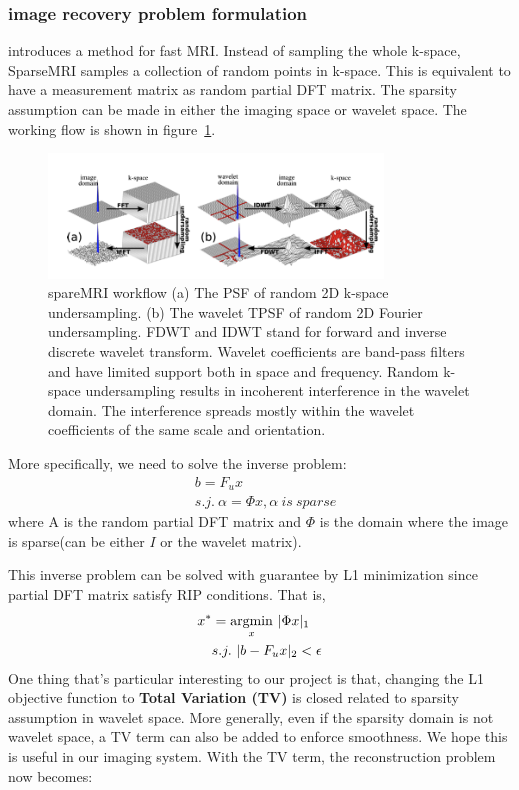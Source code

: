 \documentclass{article} %
\begin{document}
\subsubsection{image recovery problem formulation}
\cite{lustig2007sparse} introduces a method for fast MRI. Instead of sampling the whole k-space, SparseMRI samples a collection of random points in k-space. This is equivalent to have a measurement matrix as random partial DFT matrix. The sparsity assumption can be made in either the imaging space or wavelet space.  The working flow is shown in figure~\ref{fig:sparseMRIFlow}.
\begin{figure}[!h]
\centering
\includegraphics[width=3.5in]{sparseMRIFlow.png}
\caption{spareMRI workflow (a) The PSF of random 2D k-space undersampling. (b) The wavelet TPSF of random 2D Fourier undersampling. FDWT and IDWT stand for forward and inverse discrete wavelet transform. Wavelet coefficients are band-pass filters and have limited support both in space and frequency. Random k-space undersampling results in incoherent interference in the wavelet domain. The interference spreads mostly within the wavelet coefficients of the same scale and orientation.}
\label{fig:sparseMRIFlow}
\end{figure}


More specifically, we need to solve the inverse problem:
\begin{align*}
&b=F_u x \\
&s.j.~ \alpha=\Phi x,\alpha~is~sparse
\end{align*}
where A is the random partial DFT matrix and $\Phi$ is the domain where the image is sparse(can be either $I$ or the wavelet matrix).

This inverse problem can be solved with guarantee by L1 minimization since partial DFT matrix satisfy RIP conditions. That is,
\begin{align}
x^*&=\underset{x} {\mathrm{argmin}}~|\Phi x|_1 \\ 
\notag &s.j. ~|b-F_u x|_2<\epsilon
\label{eq:L1}
\end{align}
One thing that's particular interesting to our project is that, changing the L1 objective function to \textbf{Total Variation (TV)} is closed related to sparsity assumption in wavelet space. More generally, even if the sparsity domain is not wavelet space, a TV term can also be added to enforce smoothness. We hope this is useful in our imaging system. With the TV term, the reconstruction problem now becomes:
\end{document}
